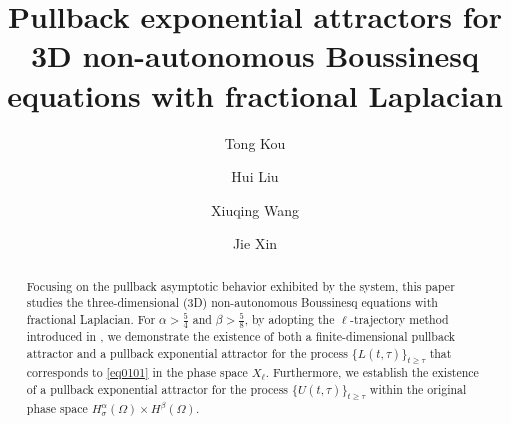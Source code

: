 \documentclass[oneside,preprint,12pt,numbers,sort&compress]{elsarticle}
\begin{document}
\newtheorem{theorem}{Theorem}[section]
\newtheorem{lemma}[theorem]{Lemma}
\newtheorem{proposition}[theorem]{Proposition}
\newtheorem{remark}[theorem]{Remark}
\newtheorem{definition}[theorem]{Definition}
\newtheorem{Hypothesis}[theorem]{Hypothesis}
\newtheorem{corollary}[theorem]{Corollary}


\begin{frontmatter}
\title{Pullback exponential attractors for 3D non-autonomous Boussinesq equations with fractional Laplacian}



\author[mymainaddress1,mymainaddress2]{Tong Kou}

\author[mymainaddress1,mymainaddress3]{Hui Liu\texorpdfstring{}{}}

\author[mymainaddress4]{Xiuqing Wang}
		
\author[mymainaddress5]{Jie Xin}



\address[mymainaddress1]{School of Mathematical Sciences, Qufu Normal University, Qufu 273165, PR China}

\address[mymainaddress2]{MOE-LCSM, School of Mathematics and Statistics, Hunan Normal University, Changsha 410081, PR China}

\address[mymainaddress3]{School of Mathematical Sciences, University of Jinan, Jinan 250022, PR China}

\address[mymainaddress4]{Faculty of Science, Kunming University of Science and Technology, Kunming 650500‌, PR China}

\address[mymainaddress5]{School of Information Engineering, Shandong Youth University of Political Science, Jinan 250103, PR China}


\begin{abstract}
\par Focusing on the pullback asymptotic behavior exhibited by the system, this paper studies the three-dimensional (3D) non-autonomous Boussinesq equations with fractional Laplacian. For $ \alpha > \frac{5}{4} $ and $ \beta > \frac{5}{8} $, by adopting the $ \ell $-trajectory method introduced in \cite{MP2002}, we demonstrate the existence of both a finite-dimensional pullback attractor and a pullback exponential attractor for the process $ \{L(t, \tau)\}_{t \geq \tau} $ that corresponds to \cref{eq0101} in the phase space $ X_{\ell} $. Furthermore, we establish the existence of a pullback exponential attractor for the process $ \{U(t, \tau)\}_{t \geq \tau} $ within the original phase space $ H_\sigma^\alpha(\Omega) \times H^{\beta}(\Omega) $.
\end{abstract}



\end{frontmatter}
\end{document}
